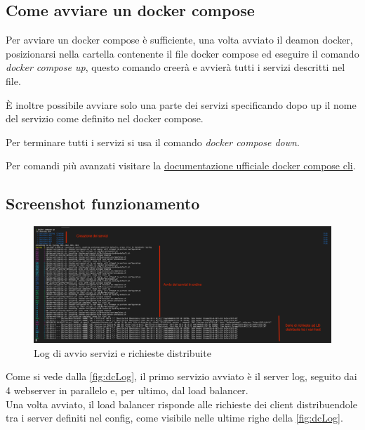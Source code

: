 \documentclass[../DocumentazioneProgetto.tex]{subfiles}
\begin{document}
	\subsection{Come avviare un docker compose} 
	Per avviare un docker compose è sufficiente, una volta avviato il deamon docker, posizionarsi nella cartella contenente il file docker compose ed eseguire 
	il comando \textit{docker compose up}, questo comando creerà e avvierà tutti i servizi descritti nel file. 

	È inoltre possibile avviare solo una parte dei servizi specificando dopo up il nome del servizio come definito nel docker compose.

	Per terminare tutti i servizi si usa il comando \textit{docker compose down}.

	Per comandi più avanzati visitare la \href{https://docs.docker.com/compose/reference/}{documentazione ufficiale docker compose cli}.

	\subsection{Screenshot funzionamento} 
	\begin{figure}[ht]
		\includegraphics[width=15cm]{images/dcLog.png}
		\centering
		\caption{Log di avvio servizi e richieste distribuite}
		\label{fig:dcLog}
	\end{figure}
	Come si vede dalla \autoref{fig:dcLog}, il primo servizio avviato è il server log, seguito dai 4 webserver in parallelo e, per ultimo, dal load balancer.\\
	Una volta avviato, il load balancer risponde alle richieste dei client distribuendole tra i server definiti nel config, come visibile nelle ultime righe della \autoref{fig:dcLog}.
\end{document}
